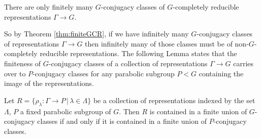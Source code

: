 \begin{theorem} \label{thm:finiteGCR} There are only finitely many $G$-conjugacy classes of $G$-completely reducible representations $\Gamma\rightarrow G$.
\end{theorem}

So by Theorem \ref{thm:finiteGCR}, if we have infinitely many $G$-conjugacy classes of representations $\Gamma\rightarrow G$ then infinitely many of those classes must be of non-$G$-completely reducible representations. The following Lemma states that the finiteness of $G$-conjugacy classes of a collection of representations $\Gamma\rightarrow G$ carries over to $P$-conjugacy classes for any parabolic subgroup $P<G$ containing the image of the representations.

\begin{lemma} Let $R=\{\rho_\lambda:\Gamma\rightarrow P\, |\, \lambda \in \Lambda\}$ be a collection of representations indexed by the set $\Lambda$, $P$ a fixed parabolic subgroup of $G$. Then $R$ is contained in a finite union of $G$-conjugacy classes if and only if it is contained in a finite union of $P$-conjugacy classes.
  \label{lem:GPconj}
\end{lemma}
